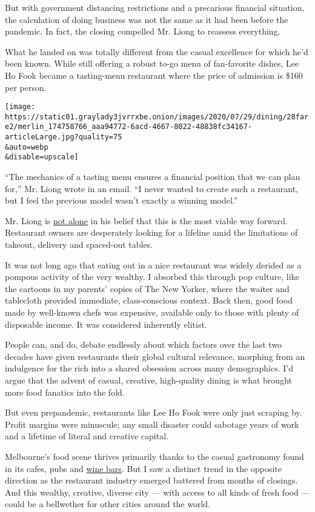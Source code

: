 But with government distancing restrictions and a precarious financial
situation, the calculation of doing business was not the same as it had
been before the pandemic. In fact, the closing compelled Mr. Liong to
reassess everything.

What he landed on was totally different from the casual excellence for
which he'd been known. While still offering a robust to-go menu of
fan-favorite dishes, Lee Ho Fook became a tasting-menu restaurant where
the price of admission is \$160 per person.

\texttt{[image: https://static01.graylady3jvrrxbe.onion/images/2020/07/29/dining/28fare2/merlin\_174758766\_aaa94772-6acd-4667-8022-48838fc34167-articleLarge.jpg?quality=75\\\&auto=webp\\\&disable=upscale]}

``The mechanics of a tasting menu ensures a financial position that we
can plan for,'' Mr. Liong wrote in an email. ``I never wanted to create
such a restaurant, but I feel the previous model wasn't exactly a
winning model.''

Mr. Liong is
\href{https://www.nytimes3xbfgragh.onion/2020/07/28/dining/ever-chicago-restaurant-coronavirus.html}{not
alone} in his belief that this is the most viable way forward.
Restaurant owners are desperately looking for a lifeline amid the
limitations of takeout, delivery and spaced-out tables.

It was not long ago that eating out in a nice restaurant was widely
derided as a pompous activity of the very wealthy. I absorbed this
through pop culture, like the cartoons in my parents' copies of The New
Yorker, where the waiter and tablecloth provided immediate,
class-conscious context. Back then, good food made by well-known chefs
was expensive, available only to those with plenty of disposable income.
It was considered inherently elitist.

People can, and do, debate endlessly about which factors over the last
two decades have given restaurants their global cultural relevance,
morphing from an indulgence for the rich into a shared obsession across
many demographics. I'd argue that the advent of casual, creative,
high-quality dining is what brought more food fanatics into the fold.

But even prepandemic, restaurants like Lee Ho Fook were only just
scraping by. Profit margins were minuscule; any small disaster could
sabotage years of work and a lifetime of literal and creative capital.

Melbourne's food scene thrives primarily thanks to the casual gastronomy
found in its cafes, pubs and
\href{https://www.nytimes3xbfgragh.onion/2019/10/30/dining/melbourne-wine-bars-restaurants.html}{wine
bars}. But I saw a distinct trend in the opposite direction as the
restaurant industry emerged battered from months of closings. And this
wealthy, creative, diverse city --- with access to all kinds of fresh
food --- could be a bellwether for other cities around the world.

